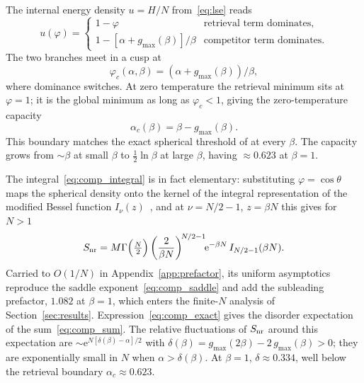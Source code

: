 \documentclass[letterpaper]{article} %
\newcommand{\e}{{\mathrm{e}}}
\newcommand{\Bnet}{\beta}
\newcommand{\ac}{\alpha_c}
\begin{document}
The internal energy density $u = H/N$ from~\eqref{eq:lse} reads
\begin{equation}
    u(\varphi) = \begin{cases}
        1 - \varphi & \text{retrieval term dominates}, \\
        1 - [\alpha + g_{\max}(\Bnet)]/\Bnet & \text{competitor term dominates}.
    \end{cases}
    \label{eq:u_piecewise}
\end{equation}
The two branches meet in a cusp at
\begin{equation}
\varphi_c(\alpha, \Bnet) = (\alpha + g_{\max}(\Bnet))/\Bnet,
\label{eq:cusp}
\end{equation}
where dominance switches. At zero temperature the retrieval minimum sits at
$\varphi = 1$; it is the global minimum as long as $\varphi_c < 1$, giving the
zero-temperature capacity
\begin{equation}
\ac(\Bnet) = \Bnet - g_{\max}(\Bnet).
\label{eq:capacity_T0}
\end{equation}
This boundary matches the exact spherical threshold of
\citet{lucibello2024exponential} at every $\Bnet$. The capacity grows from $\sim\Bnet$ at small $\Bnet$ to $\tfrac12 \ln\Bnet$ at
large $\Bnet$, having $\approx 0.623$ at $\Bnet = 1$.

The integral~\eqref{eq:comp_integral} is in fact elementary: substituting $\varphi = \cos\theta$ maps the spherical density onto the kernel of the integral representation of the modified Bessel function $I_\nu(z)$~\citep[8.431.3]{gradshteyn2015}, and at $\nu = N/2 - 1$, $z = \Bnet N$ this gives for $N > 1$
\begin{equation}
S_{\rm nr} = M \Gamma\Big(\tfrac{N}{2}\Big)\left(\frac{2}{\Bnet N}\right)^{\!N/2-1}\!\!\e^{-\Bnet N}\,I_{N/2-1}(\Bnet N).
\label{eq:comp_exact}
\end{equation}
Carried to $O(1/N)$ in Appendix~\ref{app:prefactor}, its uniform asymptotics reproduce the saddle exponent~\eqref{eq:comp_saddle} and add the subleading prefactor, $1.082$ at $\Bnet = 1$, which enters the finite-$N$ analysis of Section~\ref{sec:results}.
Expression~\eqref{eq:comp_exact} gives the disorder expectation of the sum~\eqref{eq:comp_sum}. The relative fluctuations of $S_{\rm nr}$ around this expectation are $\sim \e^{N[\delta(\Bnet) - \alpha]/2}$ with $\delta(\Bnet) = g_{\max}(2\Bnet) - 2\,g_{\max}(\Bnet) > 0$; they are exponentially small in $N$ when $\alpha > \delta(\Bnet)$. At $\Bnet = 1$, $\delta \approx 0.334$, well below the retrieval boundary $\alpha_c \approx 0.623$.
\end{document}
